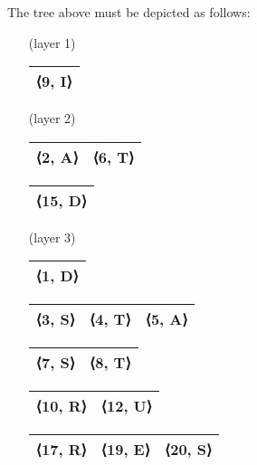 \documentclass{article}
\begin{document}
The tree above must be depicted as follows:
\setlength{\tabcolsep}{3pt}
\begin{enumerate}

    \item [(layer 1)]
        \begin{tabular}{|c|}
            \hline
             ⟨9, I⟩ \\
             \hline
        \end{tabular} \;
        
    \item [(layer 2)]
        \begin{tabular}{|c|c|}
            \hline
             ⟨2, A⟩ & ⟨6, T⟩ \\
            \hline
        \end{tabular} \;
        \begin{tabular}{|c|}
            \hline
             ⟨15, D⟩ \\
            \hline
        \end{tabular} \;
        
    \item [(layer 3)]
        \begin{tabular}{|c|}
            \hline
             ⟨1, D⟩ \\
            \hline
        \end{tabular} \;
        \begin{tabular}{|c|c|c|}
            \hline
             ⟨3, S⟩ & ⟨4, T⟩ & ⟨5, A⟩ \\
            \hline
        \end{tabular} \;
        \begin{tabular}{|c|c|}
            \hline
             ⟨7, S⟩ & ⟨8, T⟩ \\
            \hline
        \end{tabular} \;
        \begin{tabular}{|c|c|}
            \hline
             ⟨10, R⟩ & ⟨12, U⟩ \\
            \hline
        \end{tabular} \;
        \begin{tabular}{|c|c|c|}
            \hline
             ⟨17, R⟩ & ⟨19, E⟩ & ⟨20, S⟩ \\
            \hline
        \end{tabular} \;
\end{enumerate}
\end{document}
